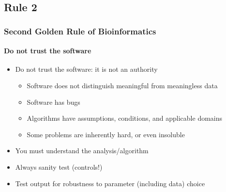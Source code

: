 %

\subsection{Rule 2}
\begin{frame}
  \frametitle{Second Golden Rule of Bioinformatics}
  \framesubtitle{Do not trust the software}
  \begin{itemize}
    \item Do not trust the software: it is not an authority
    \begin{itemize}
      \item Software does not distinguish meaningful from meaningless data
      \item Software has bugs
      \item Algorithms have assumptions, conditions, and applicable domains
      \item Some problems are inherently hard, or even insoluble
    \end{itemize}
    \item You must understand the analysis/algorithm
    \item Always sanity test (controls!)
    \item Test output for robustness to parameter (including data) choice
  \end{itemize}
\end{frame}